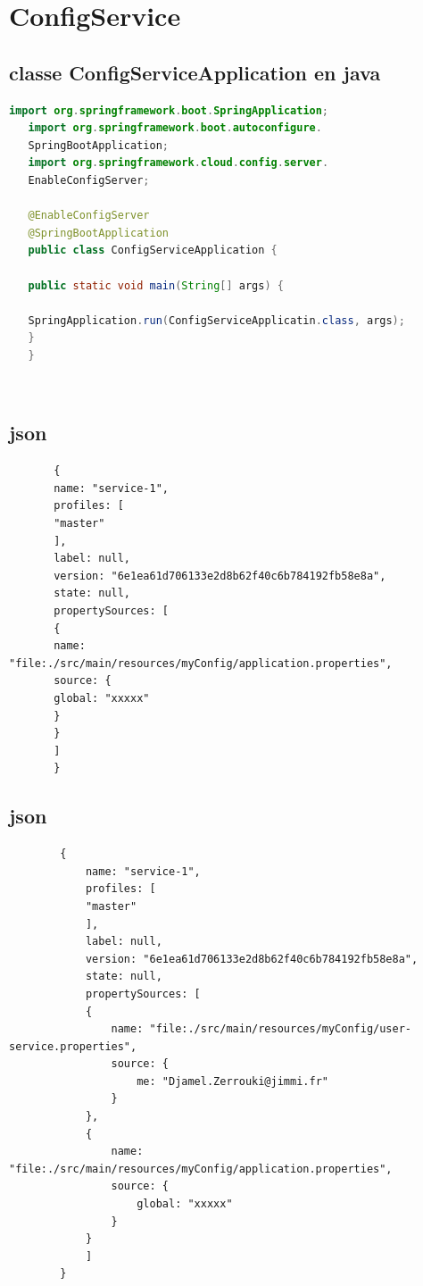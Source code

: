 \chapter{ConfigService}
 
\section{classe ConfigServiceApplication en java }
   \begin{lstlisting}[language=java]
   import org.springframework.boot.SpringApplication;
   import org.springframework.boot.autoconfigure.
   SpringBootApplication;
   import org.springframework.cloud.config.server.
   EnableConfigServer;
   
   @EnableConfigServer
   @SpringBootApplication
   public class ConfigServiceApplication {
   
   public static void main(String[] args) {
   
   SpringApplication.run(ConfigServiceApplicatin.class, args);
   }
   }
   \end{lstlisting} 
   
 \ 
  
 \section{json }
       \begin{lstlisting} 
       {
       name: "service-1",
       profiles: [
       "master"
       ],
       label: null,
       version: "6e1ea61d706133e2d8b62f40c6b784192fb58e8a",
       state: null,
       propertySources: [
       {
       name: "file:./src/main/resources/myConfig/application.properties",
       source: {
       global: "xxxxx"
       }
       }
       ]
       }
         \end{lstlisting}
        
          \section{json }
              \begin{lstlisting}
        {
        	name: "service-1",
        	profiles: [
        	"master"
        	],
        	label: null,
        	version: "6e1ea61d706133e2d8b62f40c6b784192fb58e8a",
        	state: null,
        	propertySources: [
        	{
        		name: "file:./src/main/resources/myConfig/user-service.properties",
        		source: {
        			me: "Djamel.Zerrouki@jimmi.fr"
        		}
        	},
        	{
        		name: "file:./src/main/resources/myConfig/application.properties",
        		source: {
        			global: "xxxxx"
        		}
        	}
        	]
        } 
        \end{lstlisting}
        
